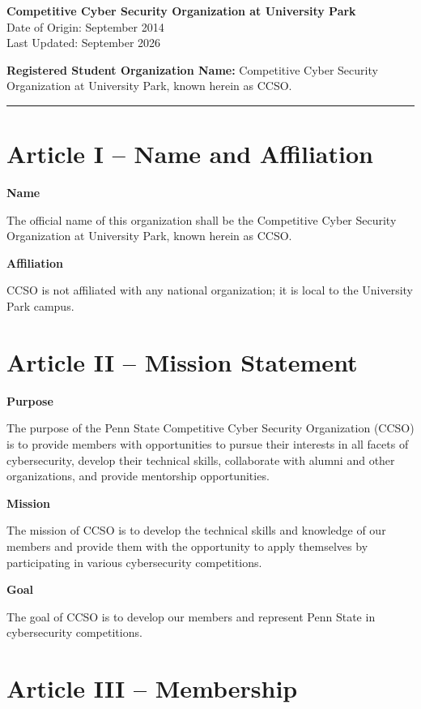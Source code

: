 \documentclass[12pt]{article}
\begin{document}
\begin{center}
{\LARGE \textbf{Competitive Cyber Security Organization at University Park}}\\[6pt]
Date of Origin: September 2014\\
Last Updated: September 2026
\end{center}

\bigskip
\noindent\textbf{Registered Student Organization Name:} Competitive Cyber Security Organization at University Park, known herein as CCSO.

\bigskip
\hrule
\bigskip

\section*{Article I -- Name and Affiliation}

\textbf{Name}

The official name of this organization shall be the Competitive Cyber Security Organization at University Park, known herein as CCSO.

\textbf{Affiliation}

CCSO is not affiliated with any national organization; it is local to the University Park campus.

\section*{Article II -- Mission Statement}

\textbf{Purpose}

The purpose of the Penn State Competitive Cyber Security Organization (CCSO) is to provide members with opportunities to pursue their interests in all facets of cybersecurity, develop their technical skills, collaborate with alumni and other organizations, and provide mentorship opportunities.

\textbf{Mission}

The mission of CCSO is to develop the technical skills and knowledge of our members and provide them with the opportunity to apply themselves by participating in various cybersecurity competitions.

\textbf{Goal}

The goal of CCSO is to develop our members and represent Penn State in cybersecurity competitions.

\section*{Article III -- Membership}
\end{document}
